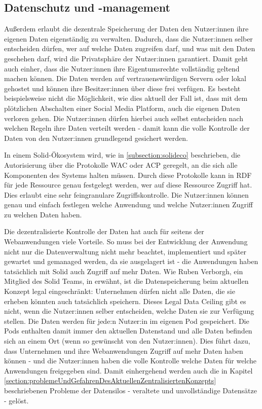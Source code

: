 \documentclass[acmtog]{acmart}
\begin{document}
\subsection{Datenschutz und -management}

Außerdem erlaubt die dezentrale Speicherung der Daten den Nutzer:innen ihre eigenen Daten eigenständig zu verwalten. Dadurch, dass die Nutzer:innen selber entscheiden dürfen, wer auf welche Daten zugreifen darf, und was mit den Daten geschehen darf, wird die Privatsphäre der Nutzer:innen garantiert. Damit geht auch einher, dass die Nutzer:innen ihre Eigentumsrechte vollständig geltend machen können. Die Daten werden auf vertrauenswürdigen Servern oder lokal gehostet und können ihre Besitzer:innen über diese frei verfügen. Es besteht beispielsweise nicht die Möglichkeit, wie dies aktuell der Fall ist, dass mit dem plötzlichen Abschalten einer Social Media Platform, auch die eigenen Daten verloren gehen. Die Nutzer:innen dürfen hierbei auch selbst entscheiden nach welchen Regeln ihre Daten verteilt werden - damit kann die volle Kontrolle der Daten von den Nutzer:innen grundlegend gesichert werden. \cite{yeung2023decentralization}

In einem Solid-Ökosystem wird, wie in \ref{subsection:solideco} beschrieben, die Autorisierung über die Protokolle WAC oder ACP geregelt, an die sich alle Komponenten des Systems halten müssen. Durch diese Protokolle kann in RDF für jede Ressource genau festgelegt werden, wer auf diese Ressource Zugriff hat. Dies erlaubt eine sehr feingranulare Zugriffskontrolle. Die Nutzer:innen können genau und einfach festlegen welche Anwendung und welche Nutzer:innen Zugriff zu welchen Daten haben.

Die dezentralisierte Kontrolle der Daten hat auch für seitens der Webanwendungen viele Vorteile. So muss bei der Entwicklung der Anwendung nicht nur die Datenverwaltung nicht mehr beachtet, implementiert und später gewartet und gemanaged werden, da sie ausgelagert ist - die Anwendungen haben tatsächlich mit Solid auch Zugriff auf mehr Daten. Wie Ruben Verborgh, ein Mitglied des Solid Teams, in \cite{MarcoNeumann.2021} erwähnt, ist die Datenspeicherung beim aktuellen Konzept legal eingeschränkt: Unternehmen dürfen nicht alle Daten, die sie erheben könnten auch tatsächlich speichern. Dieses Legal Data Ceiling gibt es nicht, wenn die Nutzer:innen selber entscheiden, welche Daten sie zur Verfügung stellen. Die Daten werden für jede:n Nutzer:in im eigenen Pod gespeichert. Die Pods enthalten damit immer den aktuellen Datenstand und alle Daten befinden sich an einem Ort (wenn so gewünscht von den Nutzer:innen). Dies führt dazu, dass Unternehmen und ihre Webanwendungen Zugriff auf mehr Daten haben können - und die Nutzer:innen haben die volle Kontrolle welche Daten für welche Anwendungen freigegeben sind. Damit einhergehend werden auch die in Kapitel \ref{section:problemeUndGefahrenDesAktuellenZentralisiertenKonzepts} beschriebenen Probleme der Datensilos - veraltete und unvollständige Datensätze - gelöst.
\end{document}
